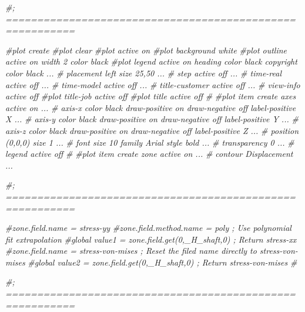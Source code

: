 \documentclass[a4paper, nobind]{templates/ociamthesis}
\newenvironment{Shaded}{\begin{snugshade}}{\end{snugshade}}
\newcommand{\CommentTok}[1]{\textcolor[rgb]{0.56,0.35,0.01}{\textit{#1}}}
\renewenvironment{Shaded}
{
  \vspace{10pt}%
  \begin{snugshade}%
}{%
  \end{snugshade}%
  \vspace{8pt}%
}
\begin{document}
\begin{Shaded}
\begin{Highlighting}[]
\CommentTok{\#; =========================================================}


\CommentTok{\#plot create}
\CommentTok{\#plot clear}
\CommentTok{\#plot active on}
\CommentTok{\#plot background \textquotesingle{}white\textquotesingle{}}
\CommentTok{\#plot outline active on width 2 color \textquotesingle{}black\textquotesingle{}}
\CommentTok{\#plot legend active on heading color \textquotesingle{}black\textquotesingle{} copyright color \textquotesingle{}black\textquotesingle{} ...}
\CommentTok{\#    placement left size 25,50 ...}
\CommentTok{\#    step active off ...}
\CommentTok{\#    time{-}real active off ...}
\CommentTok{\#    time{-}model active off ...}
\CommentTok{\#    title{-}customer active off ...}
\CommentTok{\#    view{-}info active off}
\CommentTok{\#plot title{-}job active off}
\CommentTok{\#plot title active off}
\CommentTok{\#    }
\CommentTok{\#plot item create axes active on ...}
\CommentTok{\#    axis{-}x color \textquotesingle{}black\textquotesingle{} draw{-}positive on draw{-}negative off label{-}positive \textquotesingle{}X\textquotesingle{} ...}
\CommentTok{\#    axis{-}y color \textquotesingle{}black\textquotesingle{} draw{-}positive on draw{-}negative off label{-}positive \textquotesingle{}Y\textquotesingle{} ...}
\CommentTok{\#    axis{-}z color \textquotesingle{}black\textquotesingle{} draw{-}positive on draw{-}negative off label{-}positive \textquotesingle{}Z\textquotesingle{} ...}
\CommentTok{\#    position (0,0,0) size 1 ...}
\CommentTok{\#    font size 10 family \textquotesingle{}Arial\textquotesingle{} style bold ...}
\CommentTok{\#    transparency 0 ...}
\CommentTok{\#    legend active off}
\CommentTok{\#}
\CommentTok{\#plot item create zone active on ...}
\CommentTok{\#    contour Displacement ...}

\CommentTok{\#; =========================================================}


\CommentTok{\#zone.field.name = \textquotesingle{}stress{-}yy\textquotesingle{}}
\CommentTok{\#zone.field.method.name = \textquotesingle{}poly\textquotesingle{} ; Use polynomial fit extrapolation}
\CommentTok{\#global value1 = zone.field.get(0,\_H\_shaft,0) ; Return stress{-}xx}
\CommentTok{\#zone.field.name = \textquotesingle{}stress{-}von{-}mises\textquotesingle{} ; Reset the filed name directly to \textquotesingle{}stress{-}von{-}mises\textquotesingle{}}
\CommentTok{\#global value2 = zone.field.get(0,\_H\_shaft,0) ; Return stress{-}von{-}mises}
\CommentTok{\#}


\CommentTok{\#; =========================================================}



\end{Highlighting}
\end{Shaded}
\end{document}
